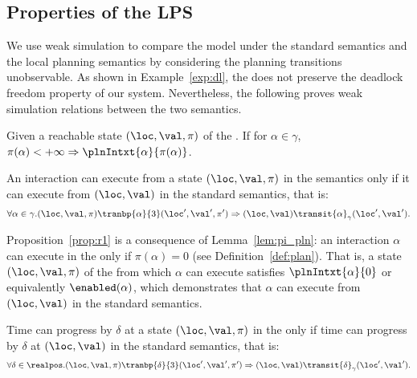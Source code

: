 \subsection{Properties of the LPS}\label{subsec:planprop}
We use weak simulation to compare the model under
the standard semantics and the local planning semantics
by considering the planning transitions unobservable.
As shown in Example~\ref{exp:dl}, the \lpsabr does not preserve the deadlock freedom property of our system.
Nevertheless, the following proves weak simulation relations between the two semantics.

\begin{lemma}\label{lem:pi_pln}
  Given a reachable state $(\loc,\val,\pi)$ of the \lpsabrb. If for $\alpha\in\gamma$, $\pi(\alpha) < +\infty \Rightarrow \plnIntxt{\alpha}{\pi(\alpha)}$.
\end{lemma}


\begin{proposition}\label{prop:r1}
An interaction can execute from a state $(\loc,\val,\pi)$ in the \lpsabr semantics only if it can execute from $(\loc,\val)$ in the standard semantics, that is:
\begin{displaymath}
      \forall\alpha\in\gamma.(\loc,\val,\pi)\tranbp{\alpha}{3}(\loc',\val',\pi')
      \Rightarrow (\loc,\val)\transit{\alpha}_{\gamma}(\loc',\val').
\end{displaymath}
\end{proposition}

Proposition~\ref{prop:r1} is a consequence of Lemma~\ref{lem:pi_pln}: an interaction $\alpha$ can execute in the \lps only if $\pi(\alpha) = 0$ (see Definition~\ref{def:plan}).
That is, a state $(\loc,\val,\pi)$ of the \lpsabr from which $\alpha$ can execute satisfies $\plnIntxt{\alpha}{0}$ or equivalently $\enabled(\alpha)$, which demonstrates that $\alpha$ can execute from $(\loc,\val)$ in the standard semantics.

\begin{proposition}\label{prop:r2}
Time can progress by $\delta$ at a state $(\loc,\val,\pi)$ in the \lps only if time can progress by $\delta$ at $(\loc,\val)$ in the standard semantics, that is:
\begin{displaymath}
      \forall\delta\in\realpos.(\loc,\val,\pi)\tranbp{\delta}{3}(\loc',\val',\pi')
      \Rightarrow (\loc,\val)\transit{\delta}_{\gamma}(\loc',\val').
\end{displaymath}
\end{proposition}

